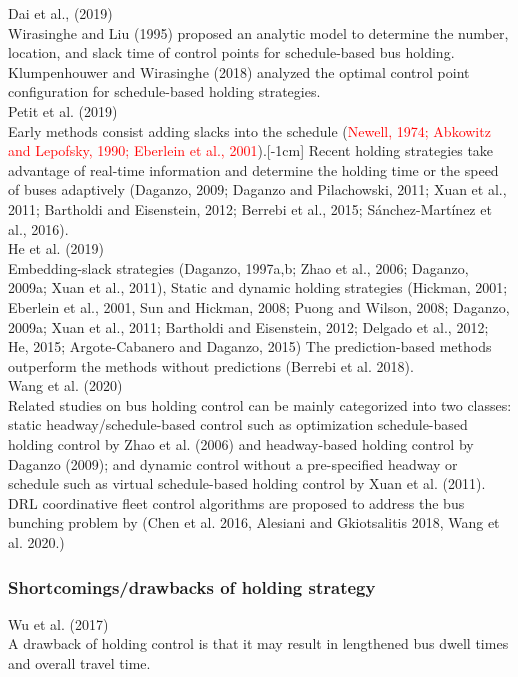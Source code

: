 \documentclass{article}
\begin{document}
\noindent \textrm{Dai et al., (2019)}\\
\textrm{Wirasinghe and Liu (1995)} proposed an analytic model 
to determine the number, 
location, 
and slack time of control points for schedule-based bus holding.
\textrm{Klumpenhouwer and Wirasinghe (2018)} analyzed the optimal control point configuration
for schedule-based holding strategies.\\

\noindent \textrm{Petit et al. (2019)}\\
Early methods consist adding slacks into the schedule
\textrm{(\textcolor{red}{Newell, 1974; Abkowitz and Lepofsky, 1990; Eberlein et al., 2001})}.\marginnote[]{\textcolor{red}{adding slacks into schedules/static schedule-based holding}}[-1cm]
Recent holding strategies take advantage of real-time information 
and determine the holding time or the speed of buses adaptively  
\textrm{(Daganzo, 2009; Daganzo and Pilachowski, 2011; Xuan et al., 2011;
Bartholdi and Eisenstein, 2012; Berrebi et al., 2015; Sánchez-Martínez et al., 2016)}.\\

\noindent \textrm{He et al. (2019)}\\
Embedding-slack strategies 
\textrm{(Daganzo, 1997a,b; Zhao et al., 2006; Daganzo, 2009a; Xuan et al., 2011)}, 
Static and dynamic holding strategies 
\textrm{(Hickman, 2001; Eberlein et al., 2001, Sun and Hickman, 2008; 
Puong and Wilson, 2008; Daganzo, 2009a; Xuan et al., 2011; 
Bartholdi and Eisenstein, 2012; Delgado et al., 2012; He, 2015; Argote-Cabanero and Daganzo, 2015)}
The prediction-based methods outperform the methods without predictions \textrm{(Berrebi et al. 2018)}.\\

\noindent \textrm{Wang et al. (2020)}\\
Related studies on bus holding control can be mainly categorized into two classes: 
static headway/schedule-based control such as 
optimization schedule-based holding control by \textrm{Zhao et al. (2006)} 
and headway-based holding control by \textrm{Daganzo (2009)};
and dynamic control without a pre-specified headway or schedule
such as virtual schedule-based holding control by \textrm{Xuan et al. (2011)}.
DRL coordinative fleet control algorithms are proposed 
to address the bus bunching problem by 
\textrm{(Chen et al. 2016, Alesiani and Gkiotsalitis 2018, Wang et al. 2020.)}\\


\subsubsection*{Shortcomings/drawbacks of holding strategy}
\noindent \textrm{Wu et al. (2017)}\\
A drawback of holding control is that 
it may result in lengthened bus dwell times and overall travel time.\\
\end{document}
